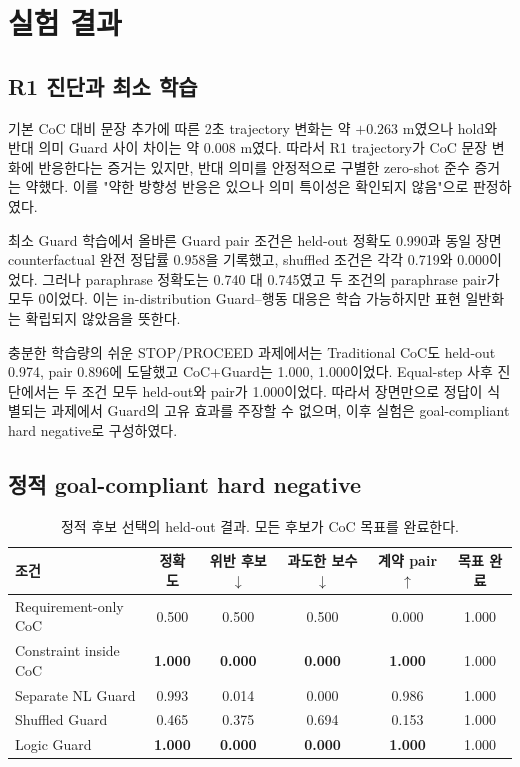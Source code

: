 \section{실험 결과}
\label{sec:results}

\subsection{R1 진단과 최소 학습}

기본 CoC 대비 문장 추가에 따른 2초 trajectory 변화는 약 $+0.263$ m였으나 hold와 반대 의미 Guard 사이 차이는 약 $0.008$ m였다. 따라서 R1 trajectory가 CoC 문장 변화에 반응한다는 증거는 있지만, 반대 의미를 안정적으로 구별한 zero-shot 준수 증거는 약했다. 이를 "약한 방향성 반응은 있으나 의미 특이성은 확인되지 않음"으로 판정하였다.

최소 Guard 학습에서 올바른 Guard pair 조건은 held-out 정확도 0.990과 동일 장면 counterfactual 완전 정답률 0.958을 기록했고, shuffled 조건은 각각 0.719와 0.000이었다. 그러나 paraphrase 정확도는 0.740 대 0.745였고 두 조건의 paraphrase pair가 모두 0이었다. 이는 in-distribution Guard--행동 대응은 학습 가능하지만 표현 일반화는 확립되지 않았음을 뜻한다.

충분한 학습량의 쉬운 STOP/PROCEED 과제에서는 Traditional CoC도 held-out 0.974, pair 0.896에 도달했고 CoC+Guard는 1.000, 1.000이었다. Equal-step 사후 진단에서는 두 조건 모두 held-out와 pair가 1.000이었다. 따라서 장면만으로 정답이 식별되는 과제에서 Guard의 고유 효과를 주장할 수 없으며, 이후 실험은 goal-compliant hard negative로 구성하였다.

\subsection{정적 goal-compliant hard negative}

\begin{table}[t]
\centering
\caption{정적 후보 선택의 held-out 결과. 모든 후보가 CoC 목표를 완료한다.}
\label{tab:static}
\footnotesize
\begin{tabular}{lccccc}
\toprule
조건 & 정확도 & 위반 후보 $\downarrow$ & 과도한 보수 $\downarrow$ & 계약 pair $\uparrow$ & 목표 완료 \\
\midrule
Requirement-only CoC & 0.500 & 0.500 & 0.500 & 0.000 & 1.000 \\
Constraint inside CoC & \textbf{1.000} & \textbf{0.000} & \textbf{0.000} & \textbf{1.000} & 1.000 \\
Separate NL Guard & 0.993 & 0.014 & 0.000 & 0.986 & 1.000 \\
Shuffled Guard & 0.465 & 0.375 & 0.694 & 0.153 & 1.000 \\
Logic Guard & \textbf{1.000} & \textbf{0.000} & \textbf{0.000} & \textbf{1.000} & 1.000 \\
\bottomrule
\end{tabular}
\end{table}

